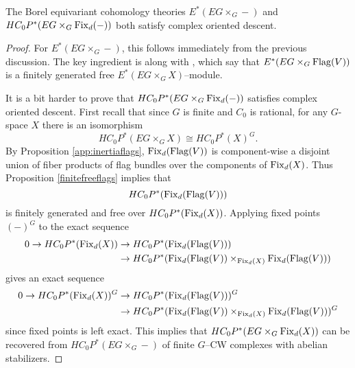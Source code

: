 \begin{proposition}
The Borel equivariant cohomology theories $E^*(EG \times_G -)$ and $HC_{0}P^{*}(EG \times_G \operatorname{Fix}_d(-))$ both satisfy complex oriented descent.
\end{proposition}
\begin{proof}
For $E^*(EG \times_G -)$, this follows immediately from the previous discussion.  The key ingredient is  along with , which say that $E^*(EG \times_G \operatorname{Flag}(V))$ is a finitely generated free $E^*(EG \times_G X)$--module. 

It is a bit harder to prove that $HC_{0}P^{*}(EG \times_G \operatorname{Fix}_d(-))$ satisfies complex oriented descent. First recall that since $G$ is finite and $C_0$ is rational, for any $G$-space $X$ there is an isomorphism
\[
HC_0P^*(EG \times_G X) \cong HC_0P^*(X)^G.
\]
By Proposition \ref{app:inertiaflags}, $\operatorname{Fix}_d(\operatorname{Flag}(V))$ is component-wise a disjoint union of fiber products of flag bundles over the components of $\operatorname{Fix}_d(X)$. Thus Proposition \ref{finitefreeflags} implies that
\[
HC_0P^*(\operatorname{Fix}_d(\operatorname{Flag}(V)))
\]
is finitely generated and free over $HC_0P^*(\operatorname{Fix}_d(X))$. Applying fixed points $(-)^G$ to the exact sequence
\begin{align*}
0 \to HC_0P^*(\operatorname{Fix}_d(X)) & \to HC_0P^*(\operatorname{Fix}_d(\operatorname{Flag}(V))) \\
& \to HC_0P^*(\operatorname{Fix}_d(\operatorname{Flag}(V)) \times_{\operatorname{Fix}_d(X)} \operatorname{Fix}_d(\operatorname{Flag}(V)))
\end{align*}
gives an exact sequence
\begin{align*}
0 \to HC_0P^*(\operatorname{Fix}_d(X))^G & \to HC_0P^*(\operatorname{Fix}_d(\operatorname{Flag}(V)))^G \\
& \to HC_0P^*(\operatorname{Fix}_d(\operatorname{Flag}(V)) \times_{\operatorname{Fix}_d(X)} \operatorname{Fix}_d(\operatorname{Flag}(V)))^G
\end{align*}
since fixed points is left exact. This implies that $HC_0P^*(EG \times_G \operatorname{Fix}_d(X))$ can be recovered from $HC_0P^*(EG \times_G-)$ of finite $G$--CW complexes with abelian stabilizers.
\end{proof}


